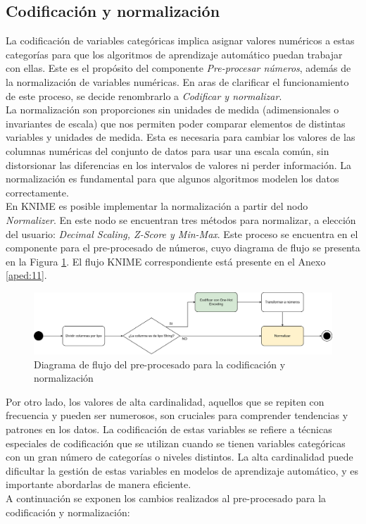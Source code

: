 \subsection{Codificación y normalización}
La codificación de variables categóricas implica asignar valores numéricos a estas categorías para que los algoritmos de aprendizaje automático puedan trabajar con ellas. Este es el propósito del componente \textit{Pre-procesar números}, además de la normalización de variables numéricas. En aras de clarificar el funcionamiento de este proceso, se decide renombrarlo a \textit{Codificar y normalizar}.\\
La normalización son proporciones sin unidades de medida (adimensionales o invariantes de escala) que nos permiten poder comparar elementos de distintas variables y unidades de medida. Esta es necesaria para cambiar los valores de las columnas numéricas del conjunto de datos para usar una escala común, sin distorsionar las diferencias en los intervalos de valores ni perder información. La normalización es fundamental para que algunos algoritmos modelen los datos correctamente. \\
En KNIME es posible implementar la normalización a partir del nodo \textit{Normalizer}. En este nodo se encuentran tres métodos para normalizar, a elección del usuario: \textit{Decimal Scaling, Z-Score y Min-Max}. Este proceso se encuentra en el componente para el pre-procesado de números, cuyo diagrama de flujo se presenta en la Figura \ref{fig:number-preprocs}. El flujo KNIME correspondiente está presente en el Anexo \ref{aped:11}. 

\begin{figure}[H]
	\centering
	\includegraphics[width=1\linewidth]{"figuras/capi 2/preprocesado/number preprocs.drawio"}
	\caption{Diagrama de flujo del pre-procesado para la codificación y normalización}
	\label{fig:number-preprocs}
\end{figure}
Por otro lado, los valores de alta cardinalidad, aquellos que se repiten con frecuencia y pueden ser numerosos, son cruciales para comprender tendencias y patrones en los datos. La codificación de estas variables se refiere a técnicas especiales de codificación que se utilizan cuando se tienen variables categóricas con un gran número de categorías o niveles distintos. La alta cardinalidad puede dificultar la gestión de estas variables en modelos de aprendizaje automático, y es importante abordarlas de manera eficiente. \\ 
A continuación se exponen los cambios realizados al pre-procesado para la codificación y normalización:

